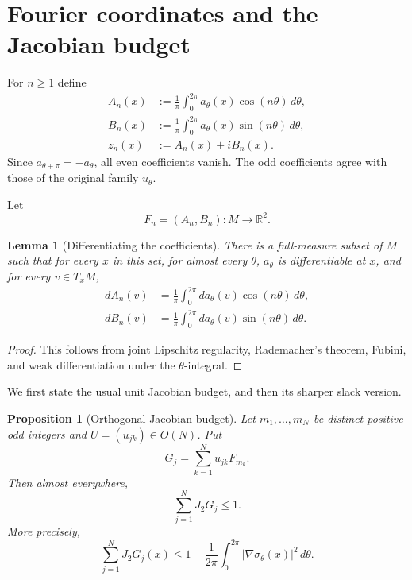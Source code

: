 \documentclass[11pt]{article}
\newtheorem{proposition}[theorem]{Proposition}
\newtheorem{lemma}[theorem]{Lemma}
\newcommand{\R}{\mathbb R}
\begin{document}
\section{Fourier coordinates and the Jacobian budget}

For $n\ge1$ define
\begin{align}
 A_n(x)&:=\frac1\pi\int_0^{2\pi}
             a_\theta(x)\cos(n\theta)\,d\theta,
 \label{eq:An}\\
 B_n(x)&:=\frac1\pi\int_0^{2\pi}
             a_\theta(x)\sin(n\theta)\,d\theta,
 \label{eq:Bn}\\
 z_n(x)&:=A_n(x)+iB_n(x).
 \label{eq:zn}
\end{align}
Since $a_{\theta+\pi}=-a_\theta$, all even coefficients vanish.  The odd
coefficients agree with those of the original family $u_\theta$.

Let
\[
        F_n=(A_n,B_n):M\to\R^2.
\]

\begin{lemma}[Differentiating the coefficients]\label{lem:diff}
There is a full-measure subset of $M$ such that for every $x$ in this set,
for almost every $\theta$, $a_\theta$ is differentiable at $x$, and for
every $v\in T_xM$,
\begin{align*}
 dA_n(v)&=\frac1\pi\int_0^{2\pi}
               da_\theta(v)\cos(n\theta)\,d\theta,\\
 dB_n(v)&=\frac1\pi\int_0^{2\pi}
               da_\theta(v)\sin(n\theta)\,d\theta.
\end{align*}
\end{lemma}

\begin{proof}
This follows from joint Lipschitz regularity, Rademacher's theorem, Fubini,
and weak differentiation under the $\theta$-integral.
\end{proof}

We first state the usual unit Jacobian budget, and then its sharper slack
version.

\begin{proposition}[Orthogonal Jacobian budget]\label{prop:budget}
Let $m_1,\ldots,m_N$ be distinct positive odd integers and
$U=(u_{jk})\in O(N)$.  Put
\[
        G_j=\sum_{k=1}^Nu_{jk}F_{m_k}.
\]
Then almost everywhere,
\begin{equation}\label{eq:budget-unit}
        \sum_{j=1}^NJ_2G_j\le1.
\end{equation}
More precisely,
\begin{equation}\label{eq:budget-defect}
 \boxed{
 \sum_{j=1}^NJ_2G_j(x)
 \le
 1-\frac1{2\pi}\int_0^{2\pi}
       |\nabla\sigma_\theta(x)|^2\,d\theta.}
\end{equation}
\end{proposition}
\end{document}
